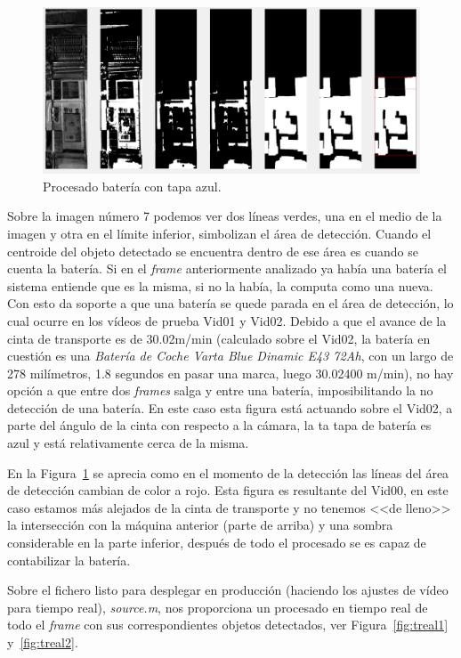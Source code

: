 \documentclass[11pt]{memoir}
\begin{document}
\begin{center}
\begin{figure}
\includegraphics[width=\textwidth]{img/T3}
\caption{Procesado batería con tapa azul.}\label{fig:procesado3}
\end{figure}
\end{center}

Sobre la imagen número 7 podemos ver dos líneas verdes, una en el medio de la imagen y otra en el límite inferior, simbolizan el área de detección. Cuando el centroide del objeto detectado se encuentra dentro de ese área es cuando se cuenta la batería. Si en el \textit{frame} anteriormente analizado ya había una batería el sistema entiende que es la misma, si no la había, la computa como una nueva. Con esto da soporte a que una batería se quede parada en el área de detección, lo cual ocurre en los vídeos de prueba Vid01 y Vid02. Debido a que el avance de la cinta de transporte es de 30.02m/min (calculado sobre el Vid02, la batería en cuestión es una \textit{Batería de Coche Varta Blue Dinamic E43 72Ah}, con un largo de 278 milímetros, 1.8 segundos en pasar una marca, luego 30.02400 m/min), no hay opción a que entre dos \textit{frames} salga y entre una batería, imposibilitando la no detección de una batería. En este caso esta figura está actuando sobre el Vid02, a parte del ángulo de la cinta con respecto a la cámara, la ta tapa de batería es azul y está relativamente cerca de la misma.

En la Figura~\ref{fig:procesado3} se aprecia como en el momento de la detección las líneas del área de detección cambian de color a rojo. Esta figura es resultante del Vid00, en este caso estamos más alejados de la cinta de transporte y no tenemos <<de lleno>> la intersección con la máquina anterior (parte de arriba) y una sombra considerable en la parte inferior, después de todo el procesado se es capaz de contabilizar la batería.

Sobre el fichero listo para desplegar en producción (haciendo los ajustes de vídeo para tiempo real), \textit{source.m}, nos proporciona un procesado en tiempo real de todo el \textit{frame} con sus correspondientes objetos detectados, ver Figura~\ref{fig:treal1} y~\ref{fig:treal2}.
\end{document}
